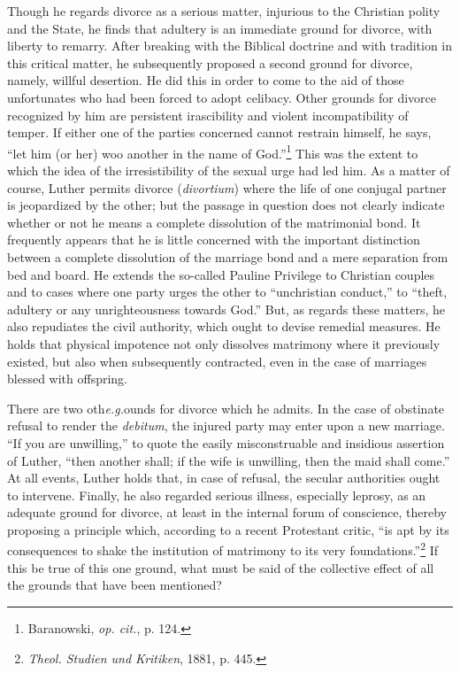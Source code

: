 Though he regards divorce as a serious matter, injurious to the Christian
polity and the State, he finds that adultery is an immediate
ground for divorce, with liberty to remarry. After breaking with
the Biblical doctrine and with tradition in this critical matter, he
subsequently proposed a second ground for divorce, namely, willful
desertion. He did this in order to come to the aid of those unfortunates
who had been forced to adopt celibacy. Other grounds for divorce
recognized by him are persistent irascibility and violent
incompatibility of temper. If either one of the parties concerned cannot
restrain himself, he says, “let him (or her) woo another in the
name of God.”\footnote{Baranowski, \textit{op. cit.}, p. 124.}
This was the extent to which the idea of the irresistibility
of the sexual urge had led him. As a matter of course,
Luther permits divorce (\textit{divortium}) where the life of one conjugal
partner is jeopardized by the other; but the passage in question does
not clearly indicate whether or not he means a complete dissolution
of the matrimonial bond. It frequently appears that he is little concerned
with the important distinction between a complete dissolution
of the marriage bond and a mere separation from bed and board. He
extends the so-called Pauline Privilege to Christian couples and to
cases where one party urges the other to “unchristian conduct,” to
“theft, adultery or any unrighteousness towards God.” But, as regards
these matters, he also repudiates the civil authority, which ought to
devise remedial measures. He holds that physical impotence not only
dissolves matrimony where it previously existed, but also when subsequently
contracted, even in the case of marriages blessed with
offspring.

There are two oth\textit{e.g.}ounds for divorce which he admits. In the
case of obstinate refusal to render the \textit{debitum}, the injured party may
enter upon a new marriage. “If you are unwilling,” to quote the easily
misconstruable and insidious assertion of Luther, “then another
shall; if the wife is unwilling, then the maid shall come.” At all
events, Luther holds that, in case of refusal, the secular authorities
ought to intervene. Finally, he also regarded serious illness, especially
leprosy, as an adequate ground for divorce, at least in the internal
forum of conscience, thereby proposing a principle which, according
to a recent Protestant critic, ``is apt by its consequences to shake the
institution of matrimony to its very foundations.''\footnote
{\textit{Theol. Studien und Kritiken}, 1881, p. 445.}
If this be true
of this one ground, what must be said of the collective effect of all
the grounds that have been mentioned?

